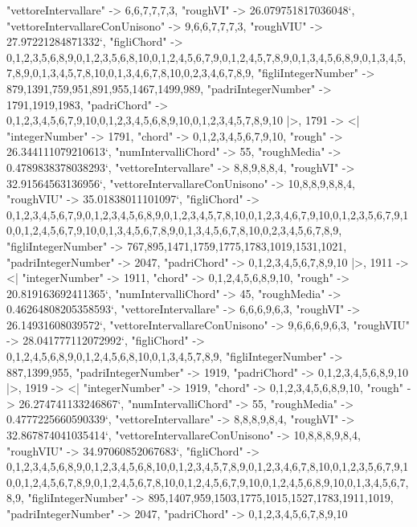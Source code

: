 \documentclass[
]{article}
\begin{document}
\begin{DatasetVerbatim}
    "vettoreIntervallare" -> {6,6,7,7,7,3},
    "roughVI" -> 26.079751817036048`,
    "vettoreIntervallareConUnisono" -> {9,6,6,7,7,7,3},
    "roughVIU" -> 27.97221284871332`,
    "figliChord" -> {{0,1,2,3,5,6,8,9},{0,1,2,3,5,6,8,10},{0,1,2,4,5,6,7,9},{0,1,2,4,5,7,8,9},{0,1,3,4,5,6,8,9},{0,1,3,4,5,7,8,9},{0,1,3,4,5,7,8,10},{0,1,3,4,6,7,8,10},{0,2,3,4,6,7,8,9}},
    "figliIntegerNumber" -> {879,1391,759,951,891,955,1467,1499,989},
    "padriIntegerNumber" -> {1791,1919,1983},
    "padriChord" -> {{0,1,2,3,4,5,6,7,9,10},{0,1,2,3,4,5,6,8,9,10},{0,1,2,3,4,5,7,8,9,10}}
  |>,
  1791 -> <|
    "integerNumber" -> 1791,
    "chord" -> {0,1,2,3,4,5,6,7,9,10},
    "rough" -> 26.344111079210613`,
    "numIntervalliChord" -> 55,
    "roughMedia" -> 0.4789838378038293`,
    "vettoreIntervallare" -> {8,8,9,8,8,4},
    "roughVI" -> 32.91564563136956`,
    "vettoreIntervallareConUnisono" -> {10,8,8,9,8,8,4},
    "roughVIU" -> 35.01838011101097`,
    "figliChord" -> {{0,1,2,3,4,5,6,7,9},{0,1,2,3,4,5,6,8,9},{0,1,2,3,4,5,7,8,10},{0,1,2,3,4,6,7,9,10},{0,1,2,3,5,6,7,9,10},{0,1,2,4,5,6,7,9,10},{0,1,3,4,5,6,7,8,9},{0,1,3,4,5,6,7,8,10},{0,2,3,4,5,6,7,8,9}},
    "figliIntegerNumber" -> {767,895,1471,1759,1775,1783,1019,1531,1021},
    "padriIntegerNumber" -> {2047},
    "padriChord" -> {{0,1,2,3,4,5,6,7,8,9,10}}
  |>,
  1911 -> <|
    "integerNumber" -> 1911,
    "chord" -> {0,1,2,4,5,6,8,9,10},
    "rough" -> 20.819163692411365`,
    "numIntervalliChord" -> 45,
    "roughMedia" -> 0.46264808205358593`,
    "vettoreIntervallare" -> {6,6,6,9,6,3},
    "roughVI" -> 26.14931608039572`,
    "vettoreIntervallareConUnisono" -> {9,6,6,6,9,6,3},
    "roughVIU" -> 28.041777112072992`,
    "figliChord" -> {{0,1,2,4,5,6,8,9},{0,1,2,4,5,6,8,10},{0,1,3,4,5,7,8,9}},
    "figliIntegerNumber" -> {887,1399,955},
    "padriIntegerNumber" -> {1919},
    "padriChord" -> {{0,1,2,3,4,5,6,8,9,10}}
  |>,
  1919 -> <|
    "integerNumber" -> 1919,
    "chord" -> {0,1,2,3,4,5,6,8,9,10},
    "rough" -> 26.274741133246867`,
    "numIntervalliChord" -> 55,
    "roughMedia" -> 0.4777225660590339`,
    "vettoreIntervallare" -> {8,8,8,9,8,4},
    "roughVI" -> 32.867874041035414`,
    "vettoreIntervallareConUnisono" -> {10,8,8,8,9,8,4},
    "roughVIU" -> 34.97060852067683`,
    "figliChord" -> {{0,1,2,3,4,5,6,8,9},{0,1,2,3,4,5,6,8,10},{0,1,2,3,4,5,7,8,9},{0,1,2,3,4,6,7,8,10},{0,1,2,3,5,6,7,9,10},{0,1,2,4,5,6,7,8,9},{0,1,2,4,5,6,7,8,10},{0,1,2,4,5,6,7,9,10},{0,1,2,4,5,6,8,9,10},{0,1,3,4,5,6,7,8,9}},
    "figliIntegerNumber" -> {895,1407,959,1503,1775,1015,1527,1783,1911,1019},
    "padriIntegerNumber" -> {2047},
    "padriChord" -> {{0,1,2,3,4,5,6,7,8,9,10}}

\end{DatasetVerbatim}
\end{document}
